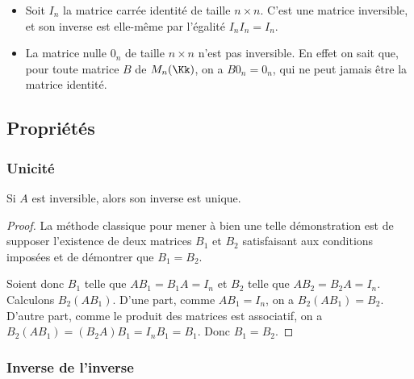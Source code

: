 \documentclass[class=report,crop=false]{standalone}
\begin{document}
\begin{exemple}
\sauteligne
\begin{itemize}
  \item Soit $I_{n}$ la matrice carrée identité de taille $n\times n$.
C'est une matrice inversible, et son inverse est elle-même par l'égalité
 $I_{n}I_{n}=I_{n}$.

  \item La matrice nulle $0_n$ de taille $n \times n$ n'est pas
inversible. En effet on sait que, pour toute matrice $B$ de $M_{n}(\Kk)$,
on a $B0_{n}=0_n$, qui ne peut jamais être la matrice identité.
\end{itemize}

\end{exemple}

\subsection{Propriétés}


\subsubsection{Unicité}


\begin{proposition}
Si $A$ est inversible, alors son inverse est unique.
\end{proposition}

\begin{proof}
La méthode classique pour mener à bien une telle démonstration est de
supposer l'existence de deux matrices $B_{1}$ et $B_{2}$
satisfaisant aux conditions imposées et de démontrer que $B_{1}=B_{2}$.

Soient donc $B_{1}$ telle que $AB_{1}=B_{1}A=I_{n}$ et $B_{2}$ telle que
$AB_{2}=B_{2}A=I_{n}$.
Calculons $B_{2}(AB_{1})$.
D'une part, comme $AB_{1}=I_{n}$, on a  $B_{2}(AB_{1})=B_{2}.$
D'autre part, comme le produit des matrices est associatif, on a
$B_{2}(AB_{1})=(B_{2}A)B_{1}=I_{n}B_{1}=B_{1}$.
Donc $B_{1}=B_{2}$.
\end{proof}

\subsubsection{Inverse de l'inverse}
\end{document}
